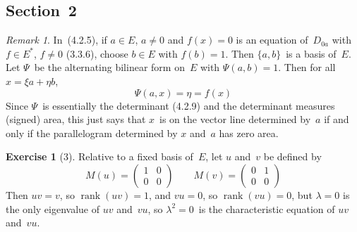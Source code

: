 \documentclass[letterpaper,12pt]{article}
\DeclareMathOperator{\rank}{rank}
\newcommand{\dual}[1]{#1^*}
\theoremstyle{definition}
\newtheorem*{exer}{Exercise}
\theoremstyle{remark}
\newtheorem*{rmk}{Remark}
\begin{document}
\subsection*{Section~2}
\begin{rmk}
In~(4.2.5), if \(a\in E\), \(a\ne 0\) and \(f(x)=0\) is an equation of~\(D_{0a}\) with \(f\in\dual{E}\), \(f\ne 0\) (3.3.6), choose \(b\in E\) with \(f(b)=1\). Then \(\{a,b\}\)~is a basis of~\(E\). Let \(\Psi\)~be the alternating bilinear form on~\(E\) with \(\Psi(a,b)=1\). Then for all \(x=\xi a+\eta b\),
\[\Psi(a,x)=\eta=f(x)\]
Since \(\Psi\)~is essentially the determinant (4.2.9) and the determinant measures (signed) area, this just says that \(x\)~is on the vector line determined by~\(a\) if and only if the parallelogram determined by \(x\) and~\(a\) has zero area.
\end{rmk}

\begin{exer}[3]
Relative to a fixed basis of~\(E\), let \(u\) and~\(v\) be defined by
\[M(u)=\begin{pmatrix}
1&0\\
0&0
\end{pmatrix}
\qquad
M(v)=\begin{pmatrix}
0&1\\
0&0
\end{pmatrix}\]
Then \(uv=v\), so \(\rank(uv)=1\), and \(vu=0\), so \(\rank(vu)=0\), but \(\lambda=0\) is the only eigenvalue of \(uv\) and~\(vu\), so \(\lambda^2=0\)~is the characteristic equation of \(uv\) and~\(vu\).
\end{exer}
\end{document}
